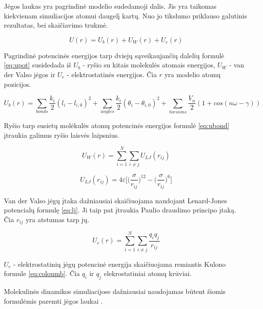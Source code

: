 Jėgos laukas yra pagrindinė modelio sudedamoji dalis.
Jis yra taikomas kiekvienam simuliacijos atomui daugelį kartų.
Nuo jo tikslumo priklauso galutinis rezultatas, bei skaičiavimo trukmė.


\begin{equation} \label{eq:upot}
    U(r) = U_b(r) + U_W(r) + U_e(r)
\end{equation}


Pagrindinė potencinės energijos tarp dviejų sąveikaujančių dalelių formulė \ref{eq:upot} susidedada iš
\(U_b\) - ryšio su kitais molekulės atomais energijos, \(U_W\) - van der Valso jėgos ir \(U_e\) - elektrostatinės  energijos.
Čia \(r\) yra modelio atomų pozicijos.

\begin{equation} \label{eq:ubond}
U_b(r) = \sum\limits_{bonds}{\dfrac {k_i} {2} (l_i - l_{i,0})^2} + \sum\limits_{angles}{\dfrac {k_i} {2} (\theta_i - \theta_{i,0})^2} + \sum\limits_{torsions}{\dfrac {V_n} {2} (1 + cos(n\omega - \gamma))}
\end{equation}

Ryšio tarp susietų molėkulės atomų potencinės energijos formulė \ref{eq:ubond} įtraukia galimus ryšio laisvės laipsnius.


\begin{equation} \label{eq:uw}
U_W(r) = \sum\limits_{i=1}^N \sum\limits_{i\neq j} {U_{LJ}(r_{ij})}
\end{equation}

\begin{equation} \label{eq:lj}
    U_{LJ}(r_{ij}) = 4\varepsilon\Bigg[\bigg(\dfrac \sigma {r_{ij}}\bigg)^{12} - \bigg(\dfrac \sigma {r_{ij}}\bigg)^6\Bigg]
\end{equation}

Van der Valso jėgų įtaka dažniausiai skaičiuojama naudojant Lenard-Jones potencialų formulę \ref{eq:lj}.
Ji taip pat įtraukia Paulio draudimo principo įtaką.
Čia \(r_{ij}\) yra atstumas tarp jų.

\begin{equation} \label{eq:coloumb}
    U_{e}(r) = \sum\limits_{i=1}^N \sum\limits_{i\neq j} {\dfrac{q_i q_j}{r_{ij}}}
\end{equation}

\(U_e\) - elektrostatinių jėgų potencinė energija skaičiuojama remiantis Kulono formule \ref{eq:coloumb}.
Čia \(q_i\) ir \(q_j\) elekrostatiniai atomų krūviai.

Molekulinės dinamikos simuliacijose dažniausiai naudojamas būtent šiomis formulėmis paremti jėgos laukai \cite{polar}.

